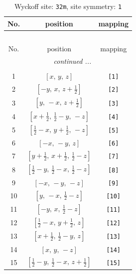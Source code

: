 \documentclass[fleqn,8pt]{jsarticle}
\begin{document}
\renewcommand{\arraystretch}{1.2}
\begin{longtable}{ccc}
\caption{Wyckoff site: {\tt 32m}, site symmetry: {\tt 1}}
 \\
 \hline \hline
No. & position & mapping \\ \hline \endfirsthead

\multicolumn{2}{l}{\tablename\ \thetable{}} \\
 \hline \hline
No. & position & mapping \\ \hline \endhead

 \hline \hline
\multicolumn{2}{r}{\footnotesize\it continued ...} \\ \endfoot

 \hline \hline
\multicolumn{2}{r}{} \\ \endlastfoot

1 & $\left[ x,\, y,\, z \right]$ & {\tt [1]} \\ \hline
2 & $\left[ - y,\, x,\, z + \frac{1}{2} \right]$ & {\tt [2]} \\ \hline
3 & $\left[ y,\, - x,\, z + \frac{1}{2} \right]$ & {\tt [3]} \\ \hline
4 & $\left[ x + \frac{1}{2},\, \frac{1}{2} - y,\, - z \right]$ & {\tt [4]} \\ \hline
5 & $\left[ \frac{1}{2} - x,\, y + \frac{1}{2},\, - z \right]$ & {\tt [5]} \\ \hline
6 & $\left[ - x,\, - y,\, z \right]$ & {\tt [6]} \\ \hline
7 & $\left[ y + \frac{1}{2},\, x + \frac{1}{2},\, \frac{1}{2} - z \right]$ & {\tt [7]} \\ \hline
8 & $\left[ \frac{1}{2} - y,\, \frac{1}{2} - x,\, \frac{1}{2} - z \right]$ & {\tt [8]} \\ \hline
9 & $\left[ - x,\, - y,\, - z \right]$ & {\tt [9]} \\ \hline
10 & $\left[ y,\, - x,\, \frac{1}{2} - z \right]$ & {\tt [10]} \\ \hline
11 & $\left[ - y,\, x,\, \frac{1}{2} - z \right]$ & {\tt [11]} \\ \hline
12 & $\left[ \frac{1}{2} - x,\, y + \frac{1}{2},\, z \right]$ & {\tt [12]} \\ \hline
13 & $\left[ x + \frac{1}{2},\, \frac{1}{2} - y,\, z \right]$ & {\tt [13]} \\ \hline
14 & $\left[ x,\, y,\, - z \right]$ & {\tt [14]} \\ \hline
15 & $\left[ \frac{1}{2} - y,\, \frac{1}{2} - x,\, z + \frac{1}{2} \right]$ & {\tt [15]} \\ \hline

\end{longtable}
\end{document}
